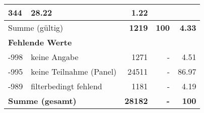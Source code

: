 \begin{longtable}{lXrrr}
       \num{344} &
       \num[round-mode=places,round-precision=2]{28,22} &
         \num[round-mode=places,round-precision=2]{1,22} \\
     \midrule
     \multicolumn{2}{l}{Summe (gültig)} &
       \textbf{\num{1219}} &
     \textbf{100} &
       \textbf{\num[round-mode=places,round-precision=2]{4,33}} \\
     \multicolumn{5}{l}{\textbf{Fehlende Werte}}\\
       -998 &
       keine Angabe &
         \num{1271} &
        - &
         \num[round-mode=places,round-precision=2]{4,51} \\
       -995 &
       keine Teilnahme (Panel) &
         \num{24511} &
        - &
         \num[round-mode=places,round-precision=2]{86,97} \\
       -989 &
       filterbedingt fehlend &
         \num{1181} &
        - &
         \num[round-mode=places,round-precision=2]{4,19} \\
     \midrule
     \multicolumn{2}{l}{\textbf{Summe (gesamt)}} &
          \textbf{\num{28182}} &
        \textbf{-} &
        \textbf{100} \\
     \bottomrule
     \end{longtable}
     
